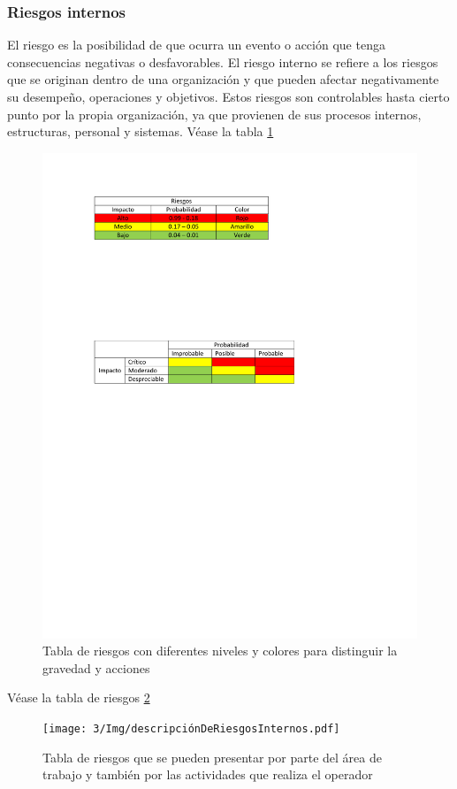     \subsubsection{Riesgos internos}
    
    El riesgo es la posibilidad de que ocurra un evento o acción que tenga consecuencias negativas o desfavorables. El riesgo interno se refiere a los riesgos que se originan dentro de una organización y que pueden afectar negativamente su desempeño, operaciones y objetivos. Estos riesgos son controlables hasta cierto punto por la propia organización, ya que provienen de sus procesos internos, estructuras, personal y sistemas.
    Véase la tabla \ref{fig:tabla de riesgos} 
    \begin{figure}[H]
        \centering
        \includegraphics[trim = {10mm 220mm 10mm 10mm},clip,scale=0.6]{3/Img/tablaDeRiesgosConDiferentesNiveles.pdf}
        \caption{Tabla de riesgos con diferentes niveles y colores para distinguir la gravedad y acciones}
        \label{fig:tabla de riesgos}
    \end{figure}
    Véase la tabla de riesgos \ref{fig:tabla de riesgos internos}
    \begin{figure}[H]
        \centering
        \texttt{[image: 3/Img/descripciónDeRiesgosInternos.pdf]}
        \caption{Tabla de riesgos que se pueden presentar por parte del área de trabajo y también por las actividades que realiza el operador} 
        \label{fig:tabla de riesgos internos}
    \end{figure}
